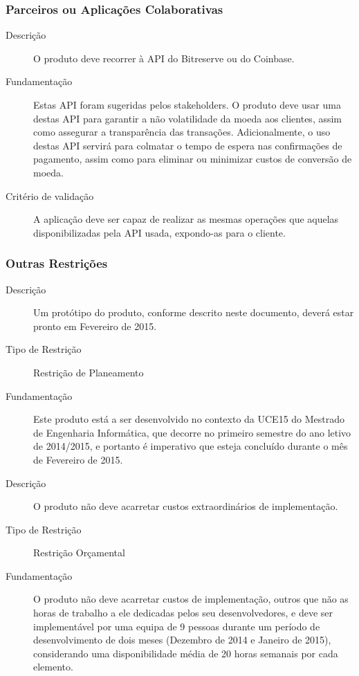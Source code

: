 \documentclass{article}
\begin{document}
    \subsubsection{Parceiros ou Aplicações Colaborativas}

      \begin{description}
        \item[Descrição]O produto deve recorrer à API do Bitreserve ou do Coinbase.
        \item[Fundamentação]Estas API foram sugeridas pelos stakeholders. O produto deve usar uma destas API para garantir a não volatilidade da moeda aos clientes, assim como assegurar a transparência das transações. Adicionalmente, o uso destas API servirá para colmatar o tempo de espera nas confirmações de pagamento, assim como para eliminar ou minimizar custos de conversão de moeda.
        \item[Critério de validação]A aplicação deve ser capaz de realizar as mesmas operações que aquelas disponibilizadas pela API usada, expondo-as para o cliente.
      \end{description}

    \subsubsection{Outras Restrições}  
      \begin{description}
        \item[Descrição]Um protótipo do produto, conforme descrito neste documento, deverá estar pronto em Fevereiro de 2015.

        \item[Tipo de Restrição]Restrição de Planeamento
        \item[Fundamentação]Este produto está a ser desenvolvido no contexto da UCE15 do Mestrado de Engenharia Informática, que decorre no primeiro semestre do ano letivo de 2014/2015, e portanto é imperativo que esteja concluído durante o mês de Fevereiro de 2015.
      \end{description}
\vspace{0.5cm}
      \begin{description}
        \item[Descrição]O produto não deve acarretar custos extraordinários de implementação.
        \item[Tipo de Restrição]Restrição Orçamental

        \item[Fundamentação]O produto não deve acarretar custos de implementação, outros que não as horas de trabalho a ele dedicadas pelos seu desenvolvedores, e deve ser implementável por uma equipa de 9 pessoas durante um período de desenvolvimento de dois meses (Dezembro de 2014 e Janeiro de 2015), considerando uma disponibilidade média de 20 horas semanais por cada elemento.
      \end{description}
\end{document}
